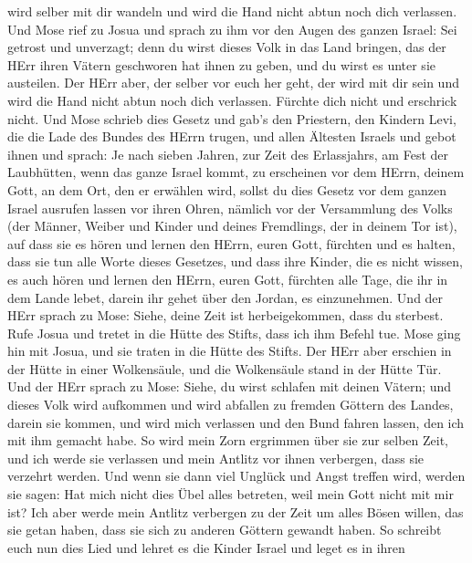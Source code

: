 wird selber mit dir wandeln und wird die Hand nicht abtun noch dich
verlassen.  Und Mose rief zu Josua und sprach zu ihm vor den
Augen des ganzen Israel: Sei getrost und unverzagt; denn du wirst dieses
Volk in das Land bringen, das der HErr ihren Vätern geschworen hat ihnen
zu geben, und du wirst es unter sie austeilen.  Der HErr
aber, der selber vor euch her geht, der wird mit dir sein und wird die
Hand nicht abtun noch dich verlassen. Fürchte dich nicht und erschrick
nicht.  Und Mose schrieb dies Gesetz und gab's den
Priestern, den Kindern Levi, die die Lade des Bundes des HErrn trugen,
und allen Ältesten Israels  und gebot ihnen und sprach: Je
nach sieben Jahren, zur Zeit des Erlassjahrs, am Fest der Laubhütten,
 wenn das ganze Israel kommt, zu erscheinen vor dem HErrn,
deinem Gott, an dem Ort, den er erwählen wird, sollst du dies Gesetz vor
dem ganzen Israel ausrufen lassen vor ihren Ohren,  nämlich
vor der Versammlung des Volks (der Männer, Weiber und Kinder und deines
Fremdlings, der in deinem Tor ist), auf dass sie es hören und lernen den
HErrn, euren Gott, fürchten und es halten, dass sie tun alle Worte
dieses Gesetzes,  und dass ihre Kinder, die es nicht
wissen, es auch hören und lernen den HErrn, euren Gott, fürchten alle
Tage, die ihr in dem Lande lebet, darein ihr gehet über den Jordan, es
einzunehmen.  Und der HErr sprach zu Mose: Siehe, deine
Zeit ist herbeigekommen, dass du sterbest. Rufe Josua und tretet in die
Hütte des Stifts, dass ich ihm Befehl tue. Mose ging hin mit Josua, und
sie traten in die Hütte des Stifts.  Der HErr aber erschien
in der Hütte in einer Wolkensäule, und die Wolkensäule stand in der
Hütte Tür.  Und der HErr sprach zu Mose: Siehe, du wirst
schlafen mit deinen Vätern; und dieses Volk wird aufkommen und wird
abfallen zu fremden Göttern des Landes, darein sie kommen, und wird mich
verlassen und den Bund fahren lassen, den ich mit ihm gemacht habe.
 So wird mein Zorn ergrimmen über sie zur selben Zeit, und
ich werde sie verlassen und mein Antlitz vor ihnen verbergen, dass sie
verzehrt werden. Und wenn sie dann viel Unglück und Angst treffen wird,
werden sie sagen: Hat mich nicht dies Übel alles betreten, weil mein
Gott nicht mit mir ist?  Ich aber werde mein Antlitz
verbergen zu der Zeit um alles Bösen willen, das sie getan haben, dass
sie sich zu anderen Göttern gewandt haben.  So schreibt
euch nun dies Lied und lehret es die Kinder Israel und leget es in ihren
